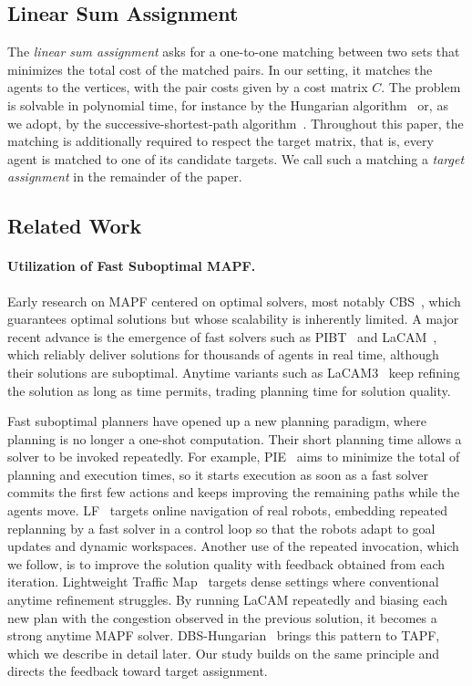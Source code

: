 \subsection{Linear Sum Assignment}
\label{sec:prelim-lap}
The \emph{linear sum assignment} asks for a one-to-one matching between two sets that minimizes the total cost of the matched pairs.
In our setting, it matches the agents to the vertices, with the pair costs given by a cost matrix $C$.
The problem is solvable in polynomial time, for instance by the Hungarian algorithm~\cite{kuhn1955hungarian} or, as we adopt, by the successive-shortest-path algorithm~\cite{ahuja1988network}.
Throughout this paper, the matching is additionally required to respect the target matrix, that is, every agent is matched to one of its candidate targets.
We call such a matching a \emph{target assignment} in the remainder of the paper.

\subsection{Related Work}
\paragraph{Utilization of Fast Suboptimal MAPF.}
Early research on MAPF centered on optimal solvers, most notably CBS~\cite{sharon2015cbs}, which guarantees optimal solutions but whose scalability is inherently limited.
A major recent advance is the emergence of fast solvers such as PIBT~\cite{okumura2022priority} and LaCAM~\cite{okumura2023lacam}, which reliably deliver solutions for thousands of agents in real time, although their solutions are suboptimal.
Anytime variants such as LaCAM3~\cite{okumura2024lacamstar} keep refining the solution as long as time permits, trading planning time for solution quality.

Fast suboptimal planners have opened up a new planning paradigm, where planning is no longer a one-shot computation.
Their short planning time allows a solver to be invoked repeatedly.
For example, PIE~\cite{zhang2024pie} aims to minimize the total of planning and execution times, so it starts execution as soon as a fast solver commits the first few actions and keeps improving the remaining paths while the agents move.
LF~\cite{shankar2025lf} targets online navigation of real robots, embedding repeated replanning by a fast solver in a control loop so that the robots adapt to goal updates and dynamic workspaces.
Another use of the repeated invocation, which we follow, is to improve the solution quality with feedback obtained from each iteration.
Lightweight Traffic Map~\cite{shen2026ltm} targets dense settings where conventional anytime refinement struggles.
By running LaCAM repeatedly and biasing each new plan with the congestion observed in the previous solution, it becomes a strong anytime MAPF solver.
DBS-Hungarian~\cite{kumagai2026alternating} brings this pattern to TAPF, which we describe in detail later.
Our study builds on the same principle and directs the feedback toward target assignment.

